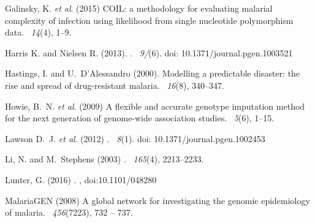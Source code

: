 \documentclass{bioinfo}
\begin{document}
\begin{thebibliography}{}
Galinsky, K. {\em et al}. (2015)
\newblock COIL: a methodology for evaluating malarial complexity of infection using likelihood from single nucleotide polymorphism data.
~{\em14\/}(4), 1--9.

Harris K. and Nielsen R. (2013).
.
~{\em9/}(6). doi: 10.1371/journal.pgen.1003521

Hastings, I. and U.~D'Alessandro (2000).
\newblock Modelling a predictable disaster: the rise and spread of drug-resistant malaria.
~{\em 16\/}(8), 340--347.

Howie, B.~N. {\em et al}. (2009)
\newblock A flexible and accurate genotype imputation method for the next generation of genome-wide association studies.
~{\em 5\/}(6), 1--15.

Lawson D.~J. {\em et al}. (2012)
.
~{\em 8\/}(1). doi: 10.1371/journal.pgen.1002453

Li, N. and M.~Stephens (2003)
.
~{\em 165\/}(4), 2213--2233.

Lunter, G. (2016)
.
, doi:10.1101/048280

MalariaGEN (2008)
\newblock A global network for investigating the genomic epidemiology of
  malaria.
~{\em 456\/}(7223), 732 -- 737.


\end{thebibliography}
\end{document}
